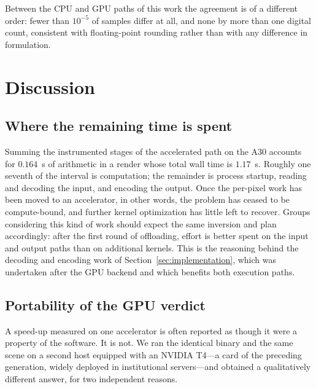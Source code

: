 \documentclass[11pt]{article}
\begin{document}
Between the CPU and GPU paths of this work the agreement is of a different
order: fewer than $10^{-5}$ of samples differ at all, and none by more than one
digital count, consistent with floating-point rounding rather than with any
difference in formulation.

\section{Discussion}
\label{sec:discussion}

\subsection{Where the remaining time is spent}
\label{sec:timebudget}

Summing the instrumented stages of the accelerated path on the A30 accounts for
$0.164$~s of arithmetic in a render whose total wall time is $1.17$~s. Roughly
one seventh of the interval is computation; the remainder is process startup,
reading and decoding the input, and encoding the output. Once the per-pixel
work has been moved to an accelerator, in other words, the problem has ceased
to be compute-bound, and further kernel optimization has little left to
recover. Groups considering this kind of work should expect the same inversion
and plan accordingly: after the first round of offloading, effort is better
spent on the input and output paths than on additional kernels. This is the
reasoning behind the decoding and encoding work of
Section~\ref{sec:implementation}, which was undertaken after the GPU backend
and which benefits both execution paths.

\subsection{Portability of the GPU verdict}
\label{sec:portability}

A speed-up measured on one accelerator is often reported as though it were a
property of the software. It is not. We ran the identical binary and the same
scene on a second host equipped with an NVIDIA T4---a card of the preceding
generation, widely deployed in institutional servers---and obtained a
qualitatively different answer, for two independent reasons.
\end{document}
